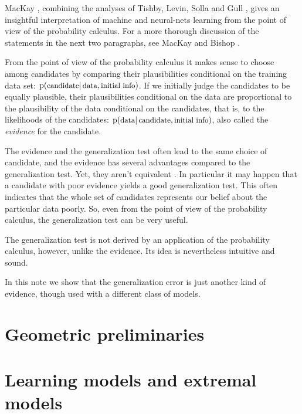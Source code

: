 \documentclass[\ifafour a4paper,12pt,\else a5paper,10pt,\fi%
onecolumn,oneside,article,%
british%
]{memoir}
\theoremstyle{remark}
\theoremstyle{innote}
\newcommand*{\citep}{\parencites}
\newcommand*{\citey}{\parencites*}
\newcommand*{\pf}{\mathrm{p}}%
\renewcommand*{\|}{\mathpunct{|}}
\newcommand*{\sect}{\S}%
\newcommand*{\sects}{\S\S}%
\newcommand*{\ptext}[1]{\text{\small #1}}
\begin{document}
MacKay \citey{mackay1992,mackay1992b}, combining the analyses of Tishby,
Levin, Solla \citep{tishbyetal1989,levinetal1990} and Gull
\citey{gull1989}, gives an insightful interpretation of machine and
neural-nets learning from the point of view of the probability calculus.
For a more thorough discussion of the statements in the next two
paragraphs, see MacKay \citey{mackay1992,mackay1992b} and Bishop
\citey[esp. \sects~1.2--3, 3.3--4, 5.7]{bishop2006}.

From the point of view of the probability calculus it makes sense to choose
among candidates by comparing their plausibilities conditional on the
training data set:
$\pf(\ptext{candidate} \| \ptext{data}, \ptext{initial info})$. If we
initially judge the candidates to be equally plausible, their
plausibilities conditional on the data are proportional to the plausibility
of the data conditional on the candidates, that is, to the likelihoods of
the candidates:
$\pf(\ptext{data} \| \ptext{candidate}, \ptext{initial info})$, also called
the \emph{evidence} for the candidate.

The evidence and the generalization test often lead to the same choice of
candidate, and the evidence has several advantages compared to the
generalization test. Yet, they aren't equivalent \citep[for a thorough
discussion of their differences see][esp. \sect~6.6]{mackay1992}[esp.
\sect~4.1]{mackay1992b}. In particular it may happen that a candidate with
poor evidence yields a good generalization test. This often indicates that
the whole set of candidates represents our belief about the particular data
poorly. So, even from the point of view of the probability calculus, the
generalization test can be very useful.

\bigskip

The generalization test is not derived by an application of the probability
calculus, however, unlike the evidence. Its idea is nevertheless intuitive and
sound.

In this note we show that the generalization error is just another kind of
evidence, though used with a different class of models.

\section{Geometric preliminaries}
\label{sec:geom_prelim}

\section{Learning models and extremal models}
\label{sec:learning_extremal}
\end{document}
